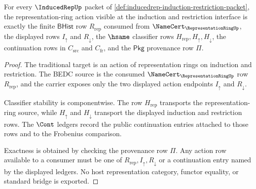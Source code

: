 \begin{theorem}
\label{thm:inducedrep-representation-ring-action-boundary}
For every $\InducedRepUp$ packet of
\autoref{def:inducedrep-induction-restriction-packet}, the
representation-ring action visible at the induction and restriction
interface is exactly the finite $\mathsf{BHist}$ row $R_{\mathrm{rep}}$
consumed from $\NameCert_{\RepresentationRingUp}$, the displayed rows
$I_{\uparrow}$ and $R_{\downarrow}$, the $\hsame$ classifier rows
$H_{\mathrm{rep}},H_{\uparrow},H_{\downarrow}$, the continuation rows in
$C_{\mathrm{src}}$ and $C_{\mathrm{fr}}$, and the $\mathsf{Pkg}$ provenance
row $\Pi$.
\end{theorem}
\begin{proof}
The traditional target is an action of representation rings on induction and
restriction. The BEDC source is the consumed
$\NameCert_{\RepresentationRingUp}$ row $R_{\mathrm{rep}}$, and the carrier
exposes only the two displayed action endpoints $I_{\uparrow}$ and
$R_{\downarrow}$.

Classifier stability is componentwise. The row $H_{\mathrm{rep}}$ transports
the representation-ring source, while $H_{\uparrow}$ and $H_{\downarrow}$
transport the displayed induction and restriction rows. The $\Cont$ ledgers
record the public continuation entries attached to those rows and to the
Frobenius comparison.

Exactness is obtained by checking the provenance row $\Pi$. Any action row
available to a consumer must be one of
$R_{\mathrm{rep}},I_{\uparrow},R_{\downarrow}$ or a continuation entry named
by the displayed ledgers. No host representation category, functor equality,
or standard bridge is exported.
\end{proof}

